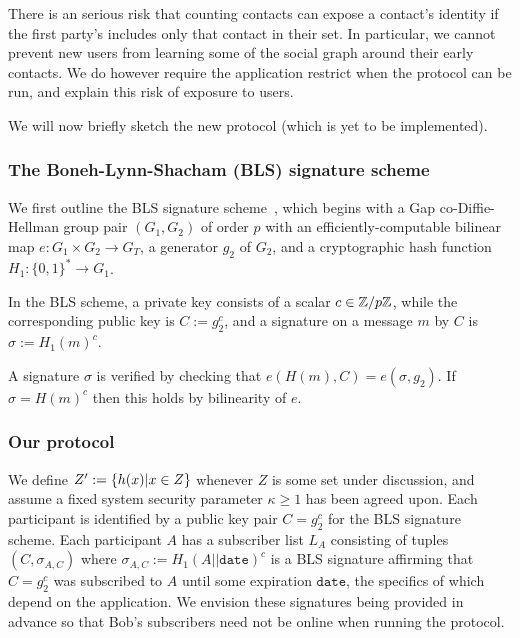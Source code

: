\documentclass{article}
\begin{document}
There is an serious risk that counting contacts can expose a
contact's identity if the first party's includes only that contact
in their set.  In particular, we cannot prevent new users from
learning some of the social graph around their early contacts.
We do however require the application restrict when the protocol
can be run, and explain this risk of exposure to users.

We will now briefly sketch the new protocol (which is yet to be
implemented).

\subsubsection{The Boneh-Lynn-Shacham (BLS) signature scheme}

We first outline the BLS signature scheme~\cite{BLS-SigWeilPairing},
which begins with a Gap co-Diffie-Hellman group pair $(G_1, G_2)$ of order $p$
with an efficiently-computable bilinear map $e\colon G_1\times G_2 \to G_T$,
 a generator $g_2$ of $G_2$,
 and a cryptographic hash function $H_1 : \{0,1\}^* \to G_1$.

In the BLS scheme, a private key consists of a scalar $c \in \mathbb{Z}/p\mathbb{Z}$,
while the corresponding public key is $C := g_2^c$, and a signature on
a message $m$ by $C$ is $\sigma := H_1(m)^c$.

A signature $\sigma$ is verified by checking that $e(H(m),C) =
e(\sigma,g_2)$.  If $\sigma = H(m)^c$ then this holds by bilinearity
of $e$.

\subsubsection{Our protocol}

We define $Z' := \{  h(x)  |  x \in Z  \}$
 whenever $Z$ is some set under discussion, and assume a fixed
system security parameter $\kappa \ge 1$ has been agreed upon.
Each participant is identified by a public key pair $C = g_2^c$
for the BLS signature scheme.  Each participant $A$ has a subscriber
list $L_A$ consisting of tuples $(C,\sigma_{A,C})$ where
$\sigma_{A,C} := H_1(A||\texttt{date})^c$ is a BLS signature affirming
that $C = g_2^c$ was subscribed to $A$ until some expiration
$\texttt{date}$, the specifics of which depend on the application.
We envision these signatures being provided in advance so that Bob's
subscribers need not be online when running the protocol.
\end{document}
